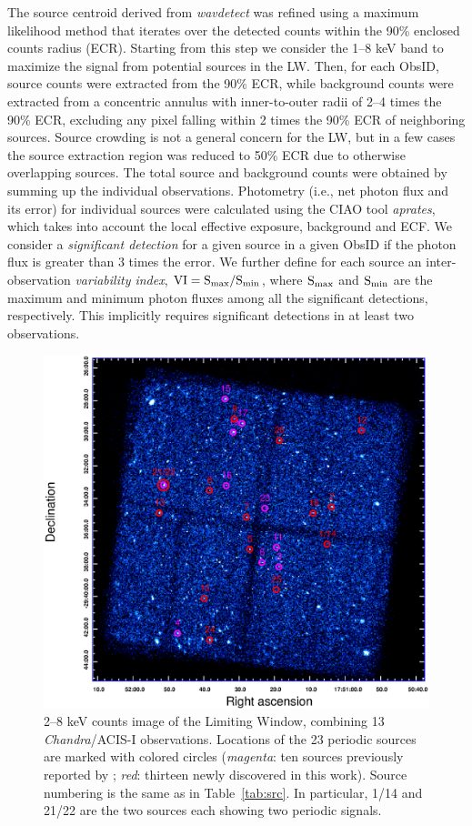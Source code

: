 \documentclass[fleqn,usenatbib]{mnras}
\begin{document}
The source centroid derived from {\it wavdetect} was refined using a maximum likelihood method that iterates over the detected counts within the 90\% enclosed counts radius (ECR).
Starting from this step we consider the 1--8 keV band to maximize the signal from potential sources in the LW. 
Then, for each ObsID, source counts were extracted from the 90\% ECR, while background counts were extracted from a concentric annulus with inner-to-outer radii of 2--4 times the 90\% ECR, excluding any pixel falling within 2 times the 90\% ECR of neighboring sources.
Source crowding is not a general concern for the LW, but in a few cases the source extraction region was reduced to 50\% ECR due to otherwise overlapping sources. 
The total source and background counts were obtained by summing up the individual observations. 
Photometry (i.e., net photon flux and its error) for individual sources were calculated using the CIAO tool \emph{aprates}, which takes into account the local effective exposure, background and ECF. 
We consider a {\it significant detection} for a given source in a given ObsID if the photon flux is greater than 3 times the error. 
We further define for each source an inter-observation {\it variability index}, $\rm VI=S_{max}/S_{min}$, where $\rm S_{max}$ and $\rm S_{min}$ are the maximum and minimum photon fluxes among all the significant detections, respectively. This implicitly requires significant detections in at least two observations.

\begin{figure}
\centering
\includegraphics[scale=0.8]{./figure/LW/ds9.eps}
\caption{2--8 keV counts image of the Limiting Window, combining 13 {\it Chandra}/ACIS-I observations. Locations of the 23 periodic sources are marked with colored circles ({\it magenta}: ten sources previously reported by \citealp{2012ApJ...746..165H}; {\it red}: thirteen newly discovered in this work). Source numbering is the same as in Table~\ref{tab:src}. In particular, 1/14 and 21/22 are the two sources each showing two periodic signals.}
\label{fig:FoV}
\end{figure}
\end{document}
